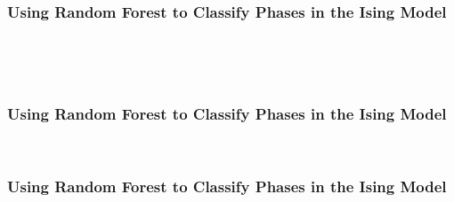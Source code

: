 \documentclass[11pt]{article}
\begin{document}
    \begin{center}
    \end{center}
    { \hspace*{\fill} \\}

\newpage
\hypertarget{using-random-forest-to-classify-phases-in-the-ising-model}{%
\subsubsection{Using Random Forest to Classify Phases in the Ising
Model}\label{using-random-forest-to-classify-phases-in-the-ising-model2}}

    \begin{center}
    \end{center}
    { \hspace*{\fill} \\}

    \begin{center}
    \end{center}
    { \hspace*{\fill} \\}

\newpage
\hypertarget{using-random-forest-to-classify-phases-in-the-ising-model}{%
\subsubsection{Using Random Forest to Classify Phases in the Ising
Model}\label{using-random-forest-to-classify-phases-in-the-ising-model3}}
    \begin{center}
    \end{center}
    { \hspace*{\fill} \\}

\newpage
\hypertarget{using-random-forest-to-classify-phases-in-the-ising-model}{%
\subsubsection{Using Random Forest to Classify Phases in the Ising
Model}\label{using-random-forest-to-classify-phases-in-the-ising-model4}}
    \begin{center}
    \end{center}
    { \hspace*{\fill} \\}
\end{document}
